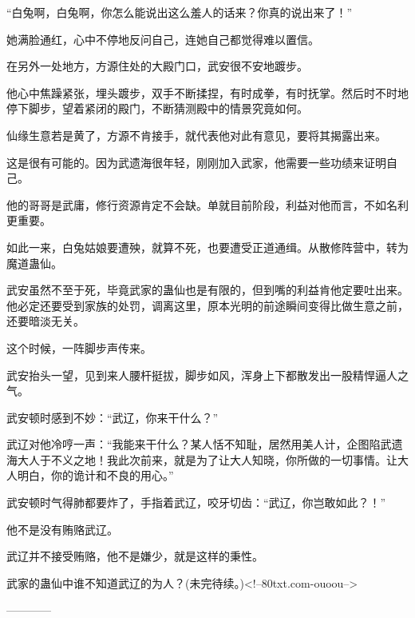 \begin{this_body}
“白兔啊，白兔啊，你怎么能说出这么羞人的话来？你真的说出来了！”

她满脸通红，心中不停地反问自己，连她自己都觉得难以置信。

在另外一处地方，方源住处的大殿门口，武安很不安地踱步。

他心中焦躁紧张，埋头踱步，双手不断揉捏，有时成拳，有时抚掌。然后时不时地停下脚步，望着紧闭的殿门，不断猜测殿中的情景究竟如何。

仙缘生意若是黄了，方源不肯接手，就代表他对此有意见，要将其揭露出来。

这是很有可能的。因为武遗海很年轻，刚刚加入武家，他需要一些功绩来证明自己。

他的哥哥是武庸，修行资源肯定不会缺。单就目前阶段，利益对他而言，不如名利更重要。

如此一来，白兔姑娘要遭殃，就算不死，也要遭受正道通缉。从散修阵营中，转为魔道蛊仙。

武安虽然不至于死，毕竟武家的蛊仙也是有限的，但到嘴的利益肯他定要吐出来。他必定还要受到家族的处罚，调离这里，原本光明的前途瞬间变得比做生意之前，还要暗淡无关。

这个时候，一阵脚步声传来。

武安抬头一望，见到来人腰杆挺拔，脚步如风，浑身上下都散发出一股精悍逼人之气。

武安顿时感到不妙：“武辽，你来干什么？”

武辽对他冷哼一声：“我能来干什么？某人恬不知耻，居然用美人计，企图陷武遗海大人于不义之地！我此次前来，就是为了让大人知晓，你所做的一切事情。让大人明白，你的诡计和不良的用心。”

武安顿时气得肺都要炸了，手指着武辽，咬牙切齿：“武辽，你岂敢如此？！”

他不是没有贿赂武辽。

武辽并不接受贿赂，他不是嫌少，就是这样的秉性。

武家的蛊仙中谁不知道武辽的为人？(未完待续。)<!--80txt.com-ouoou-->

------------

\end{this_body}

